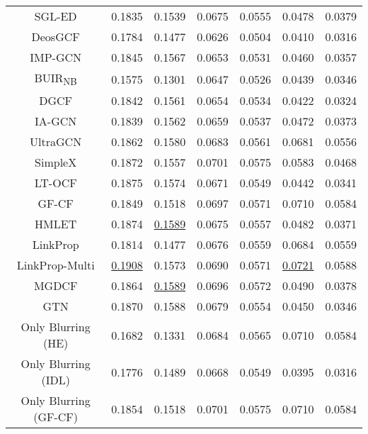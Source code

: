 \documentclass[sigconf,natbib=true]{acmart}
\begin{document}
\begin{table}[ht!]
\begin{tabular}{c cc cc cc}
        SGL-ED                  & 0.1835 & 0.1539           & 0.0675 & 0.0555  & 0.0478	& 0.0379 \\
        DeosGCF                 & 0.1784 & 0.1477           & 0.0626 & 0.0504  & 0.0410 & 0.0316 \\
        IMP-GCN                 & 0.1845 & 0.1567           & 0.0653 & 0.0531  & 0.0460 & 0.0357 \\
        {BUIR\textsubscript{NB}}             & 0.1575 & 0.1301           & 0.0647 & 0.0526  & 0.0439 & 0.0346 \\
        DGCF                    & 0.1842 & 0.1561           & 0.0654 & 0.0534  & 0.0422 & 0.0324 \\
        {IA-GCN}                  & 0.1839 & 0.1562           & 0.0659 & 0.0537  & 0.0472 & 0.0373 \\
        UltraGCN                & 0.1862 & 0.1580 & 0.0683 & 0.0561  & 0.0681 & 0.0556 \\
        {SimpleX}                 & 0.1872 & 0.1557           & 0.0701 & 0.0575  & 0.0583 & 0.0468 \\
        LT-OCF                  & 0.1875 & 0.1574           & 0.0671 & 0.0549  & 0.0442 & 0.0341 \\
        GF-CF                   & 0.1849 & 0.1518           & 0.0697 & 0.0571  & 0.0710 & 0.0584 \\
        HMLET            & 0.1874 & \underline{0.1589} & 0.0675 & 0.0557  & 0.0482 & 0.0371 \\
        LinkProp                & 0.1814 & 0.1477           & 0.0676 & 0.0559  & 0.0684 & 0.0559 \\
        LinkProp-Multi          & \underline{0.1908} & 0.1573
                                                            & 0.0690 & 0.0571  & \underline{0.0721} & 0.0588 \\
        MGDCF        & 0.1864 & \underline{0.1589}
                                                            & 0.0696 & 0.0572  & 0.0490 & 0.0378 \\
        GTN              & 0.1870 & 0.1588           & 0.0679 & 0.0554  & 0.0450 & 0.0346 \\
        \midrule
        Only Blurring (HE)      & 0.1682 & 0.1331           & 0.0684 & 0.0565  & 0.0710 & 0.0584 \\
        Only Blurring (IDL)     & 0.1776 & 0.1489           & 0.0668 & 0.0549  & 0.0395 & 0.0316 \\
        Only Blurring (GF-CF)   & 0.1854 & 0.1518           & 0.0701 & 0.0575 & 0.0710  & 0.0584\\

\end{tabular}
\end{table}
\end{document}
